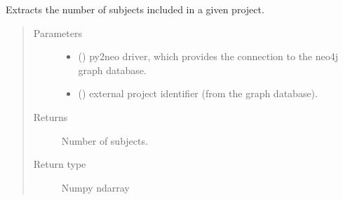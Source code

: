 \documentclass[letterpaper,10pt,english]{sphinxmanual}
\begin{document}
\begin{fulllineitems}
\label{\detokenize{_autosummary/report_manager.apps:report_manager.apps.dataUpload.get_subjects_enrolled_in_project}}
Extracts the number of subjects included in a given project.
\begin{quote}\begin{description}
\item[{Parameters}] \leavevmode\begin{itemize}
\item {} 
 () \textendash{} py2neo driver, which provides the connection to the neo4j graph database.

\item {} 
 () \textendash{} external project identifier (from the graph database).

\end{itemize}

\item[{Returns}] \leavevmode
Number of subjects.

\item[{Return type}] \leavevmode
Numpy ndarray

\end{description}\end{quote}

\end{fulllineitems}


\begin{fulllineitems}
\label{\detokenize{_autosummary/report_manager.apps:report_manager.apps.dataUpload.check_samples_in_project}}
\end{fulllineitems}

\end{document}
